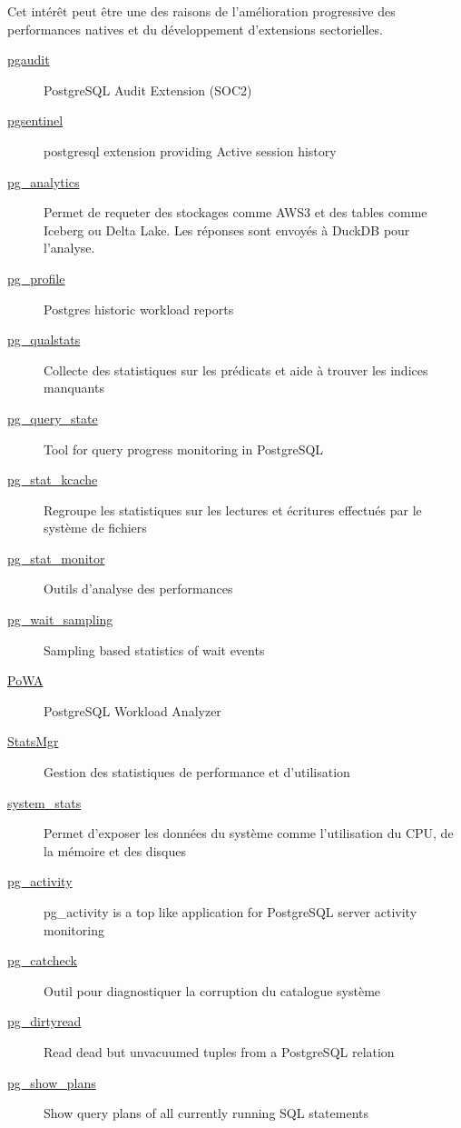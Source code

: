 \documentclass[a4paper,12pt]{article}
\begin{document}
\begin{multicols*}{2}
Cet intérêt peut être une des raisons de l'amélioration progressive des performances natives et du développement d'extensions sectorielles.
\begin{description}
\item[{\href{https://github.com/pgaudit/pgaudit}{pgaudit}}] PostgreSQL Audit Extension (SOC2)
\item[{\href{https://github.com/pgsentinel/pgsentinel}{pgsentinel}}] postgresql extension providing Active session history
\item[{\href{https://github.com/paradedb/pg\_analytics}{pg\_analytics}}] Permet de requeter des stockages comme AWS3 et des tables comme Iceberg ou Delta Lake. Les réponses sont envoyés à DuckDB pour l'analyse.
\item[{\href{https://github.com/zubkov-andrei/pg\_profile}{pg\_profile}}] Postgres historic workload reports
\item[{\href{https://github.com/powa-team/pg\_qualstats/}{pg\_qualstats}}] Collecte des statistiques sur les prédicats et aide à trouver les indices manquants
\item[{\href{https://github.com/postgrespro/pg\_query\_state}{pg\_query\_state}}] Tool for query progress monitoring in PostgreSQL
\item[{\href{https://github.com/powa-team/pg\_stat\_kcache/}{pg\_stat\_kcache}}] Regroupe les statistiques sur les lectures et écritures effectués par le système de fichiers
\item[{\href{https://github.com/percona/pg\_stat\_monitor}{pg\_stat\_monitor}}] Outils d'analyse des performances
\item[{\href{https://github.com/postgrespro/pg\_wait\_sampling}{pg\_wait\_sampling}}] Sampling based statistics of wait events
\item[{\href{https://github.com/powa-team/powa}{PoWA}}] PostgreSQL Workload Analyzer
\item[{\href{https://codeberg.org/Data-Bene/StatsMgr}{StatsMgr}}] Gestion des statistiques de performance et d'utilisation
\item[{\href{https://github.com/EnterpriseDB/system\_stats}{system\_stats}}] Permet d'exposer les données du système comme l'utilisation du CPU, de la mémoire et des disques
\item[{\href{https://github.com/dalibo/pg\_activity}{pg\_activity}}] pg\_activity is a top like application for PostgreSQL server activity monitoring
\item[{\href{https://github.com/EnterpriseDB/pg\_catcheck}{pg\_catcheck}}] Outil pour diagnostiquer la corruption du catalogue système
\item[{\href{https://github.com/df7cb/pg\_dirtyread}{pg\_dirtyread}}] Read dead but unvacuumed tuples from a PostgreSQL relation
\item[{\href{https://github.com/cybertec-postgresql/pg\_show\_plans}{pg\_show\_plans}}] Show query plans of all currently running SQL statements


\end{description}
\end{multicols*}
\end{document}
